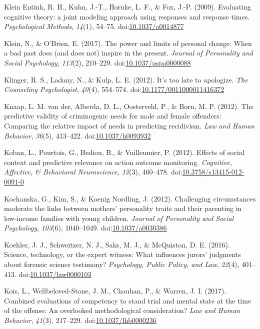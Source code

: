 \documentclass[english,man]{apa6}
\theoremstyle{definition}
\theoremstyle{definition}
\theoremstyle{definition}
\theoremstyle{remark}
\begin{document}
\hypertarget{ref-KleinEntink2009}{}
Klein Entink, R. H., Kuhn, J.-T., Hornke, L. F., \& Fox, J.-P. (2009).
Evaluating cognitive theory: a joint modeling approach using responses
and response times. \emph{Psychological Methods}, \emph{14}(1), 54--75.
doi:\href{https://doi.org/10.1037/a0014877}{10.1037/a0014877}

\hypertarget{ref-Klein2017}{}
Klein, N., \& O'Brien, E. (2017). The power and limits of personal
change: When a bad past does (and does not) inspire in the present.
\emph{Journal of Personality and Social Psychology}, \emph{113}(2),
210--229.
doi:\href{https://doi.org/10.1037/pspa0000088}{10.1037/pspa0000088}

\hypertarget{ref-Klinger2012}{}
Klinger, R. S., Ladany, N., \& Kulp, L. E. (2012). It's too late to
apologize. \emph{The Counseling Psychologist}, \emph{40}(4), 554--574.
doi:\href{https://doi.org/10.1177/0011000011416372}{10.1177/0011000011416372}

\hypertarget{ref-VanderKnaap2012}{}
Knaap, L. M. van der, Alberda, D. L., Oosterveld, P., \& Born, M. P.
(2012). The predictive validity of criminogenic needs for male and
female offenders: Comparing the relative impact of needs in predicting
recidivism. \emph{Law and Human Behavior}, \emph{36}(5), 413--422.
doi:\href{https://doi.org/10.1037/h0093932}{10.1037/h0093932}

\hypertarget{ref-Koban2012}{}
Koban, L., Pourtois, G., Bediou, B., \& Vuilleumier, P. (2012). Effects
of social context and predictive relevance on action outcome monitoring.
\emph{Cognitive, Affective, \& Behavioral Neuroscience}, \emph{12}(3),
460--478.
doi:\href{https://doi.org/10.3758/s13415-012-0091-0}{10.3758/s13415-012-0091-0}

\hypertarget{ref-Kochanska2012}{}
Kochanska, G., Kim, S., \& Koenig Nordling, J. (2012). Challenging
circumstances moderate the links between mothers' personality traits and
their parenting in low-income families with young children.
\emph{Journal of Personality and Social Psychology}, \emph{103}(6),
1040--1049.
doi:\href{https://doi.org/10.1037/a0030386}{10.1037/a0030386}

\hypertarget{ref-Koehler2016}{}
Koehler, J. J., Schweitzer, N. J., Saks, M. J., \& McQuiston, D. E.
(2016). Science, technology, or the expert witness: What influences
jurors' judgments about forensic science testimony? \emph{Psychology,
Public Policy, and Law}, \emph{22}(4), 401--413.
doi:\href{https://doi.org/10.1037/law0000103}{10.1037/law0000103}

\hypertarget{ref-Kois2017}{}
Kois, L., Wellbeloved-Stone, J. M., Chauhan, P., \& Warren, J. I.
(2017). Combined evaluations of competency to stand trial and mental
state at the time of the offense: An overlooked methodological
consideration? \emph{Law and Human Behavior}, \emph{41}(3), 217--229.
doi:\href{https://doi.org/10.1037/lhb0000236}{10.1037/lhb0000236}
\end{document}
